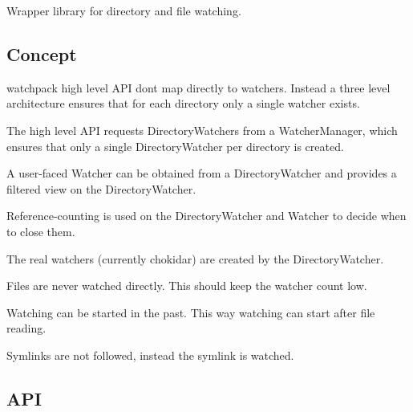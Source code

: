 Wrapper library for directory and file watching.

\href{https://travis-ci.org/webpack/watchpack}{\tt } \href{https://ci.appveyor.com/project/sokra/watchpack/branch/master}{\tt } \href{https://coveralls.io/r/webpack/watchpack/}{\tt }

\subsection*{Concept}

watchpack high level A\+PI don\textquotesingle{}t map directly to watchers. Instead a three level architecture ensures that for each directory only a single watcher exists.


\begin{DoxyItemize}
\item The high level A\+PI requests {\ttfamily Directory\+Watchers} from a {\ttfamily Watcher\+Manager}, which ensures that only a single {\ttfamily Directory\+Watcher} per directory is created.
\item A user-\/faced {\ttfamily Watcher} can be obtained from a {\ttfamily Directory\+Watcher} and provides a filtered view on the {\ttfamily Directory\+Watcher}.
\item Reference-\/counting is used on the {\ttfamily Directory\+Watcher} and {\ttfamily Watcher} to decide when to close them.
\item The real watchers (currently chokidar) are created by the {\ttfamily Directory\+Watcher}.
\item Files are never watched directly. This should keep the watcher count low.
\item Watching can be started in the past. This way watching can start after file reading.
\item Symlinks are not followed, instead the symlink is watched.
\end{DoxyItemize}

\subsection*{A\+PI}


